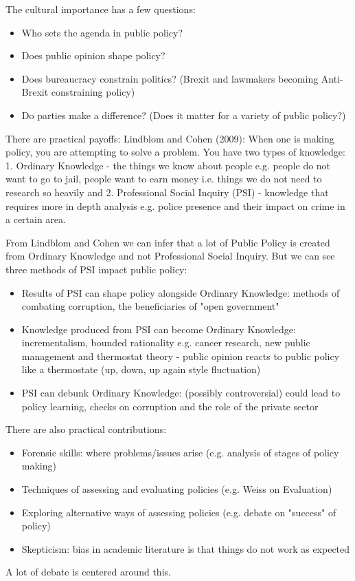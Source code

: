\documentclass[12pt, letterpaper]{article}
\begin{document}
{\vspace{10pt}
\noindent The cultural importance has a few questions:
\begin{itemize}
	\item Who sets the agenda in public policy?
	\item Does public opinion shape policy?
	\item Does bureaucracy constrain politics? (Brexit and lawmakers becoming Anti-Brexit constraining policy)
	\item Do parties make a difference? (Does it matter for a variety of public policy?)
\end{itemize}
There are practical payoffs: Lindblom and Cohen (2009): When one is making policy, you are attempting to solve a problem. You have two types of knowledge: 1. Ordinary Knowledge - the things we know about people e.g. people do not want to go to jail, people want to earn money i.e. things we do not need to research so heavily and 2. Professional Social Inquiry (PSI) - knowledge that requires more in depth analysis e.g. police presence and their impact on crime in a certain area.

\vspace{10pt}
\noindent From Lindblom and Cohen we can infer that a lot of Public Policy is created from Ordinary Knowledge and not Professional Social Inquiry. But we can see three methods of PSI impact public policy:
\begin{itemize}
	\item Results of PSI can shape policy alongside Ordinary Knowledge: methods of combating corruption, the beneficiaries of "open government"
	\item Knowledge produced from PSI can become Ordinary Knowledge: incrementalism, bounded rationality e.g. cancer research, new public management and thermostat theory - public opinion reacts to public policy like a thermostate (up, down, up again style fluctuation)
	\item PSI can debunk Ordinary Knowledge: (possibly controversial) could lead to policy learning, checks on corruption and the role of the private sector
\end{itemize}

\vspace{10pt}
\noindent There are also practical contributions:
\begin{itemize}
	\item Forensic skills: where problems/issues arise (e.g. analysis of stages of policy making)
	\item Techniques of assessing and evaluating policies (e.g. Weiss on Evaluation)
	\item Exploring alternative ways of assessing policies (e.g. debate on "success" of policy)
	\item Skepticism: bias in academic literature is that things do not work as expected
\end{itemize}
A lot of debate is centered around this.

}
\end{document}
